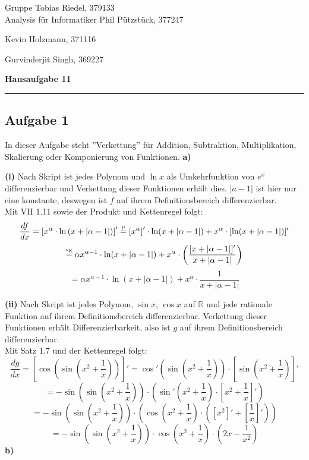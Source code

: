 \documentclass[a4paper,graphics,11pt]{article}
\newcommand{\aufgabe}[1]{\subsection*{Aufgabe #1}}
\newcommand{\up}[2]{\mathrel{\overset{\makebox[0pt]{\mbox{\normalfont\tiny #2}}}{#1}}}
\begin{document}
\noindent Gruppe              \hfill Tobias Riedel, 379133 \\
\noindent Analysis für Informatiker             \hfill Phil Pützstück, 377247 \\
\strut\hfill Kevin Holzmann, 371116\\
\strut\hfill Gurvinderjit Singh, 369227
\begin{center}
	\LARGE{\textbf{Hausaufgabe 11}}
\end{center}
\begin{center}
\rule[0.1ex]{\textwidth}{1pt}
\end{center}



\aufgabe{1}
In dieser Aufgabe steht ''Verkettung'' für Addition, Subtraktion, Multiplikation, Skalierung oder Komponierung
von Funktionen.
\textbf{a)}

\textbf{(i)}
Nach Skript ist jedes Polynom und $\ln x$ als Umkehrfunktion von $e^x$ differenzierbar und Verkettung dieser Funktionen erhält dies.
$|a-1|$ ist hier nur eine konstante, deswegen ist $f$ auf ihrem Definitionsbereich differenzierbar.\\
Mit VII 1.11 sowie der Produkt und Kettenregel folgt:
$$
    \frac{df}{dx} = \left[x^{\alpha} \cdot \ln\left(x+|\alpha-1|\right)\right]'
    \up{=}{P} \left[x^{\alpha}\right]'\cdot \ln(x+|\alpha-1|) + x^{\alpha} \cdot [\ln(x+|\alpha-1|)]'
$$$$
    \up{=}{*K} \alpha x^{\alpha-1}\cdot \ln(x+|\alpha-1|)
        + x^{\alpha} \cdot \left(\frac{[x+|\alpha-1|]'}{x+|\alpha-1|}\right)
$$$$
    = \alpha x^{\alpha-1}\cdot \ln(x+|\alpha-1|)
        + x^{\alpha} \cdot \frac{1}{x+|\alpha-1|}
$$



\textbf{(ii)}
Nach Skript ist jedes Polynom, $\sin x$, $\cos x$ auf $\mathbb{R}$ und jede rationale Funktion auf ihrem
Definitionsbereich differenzierbar. Verkettung dieser Funktionen erhält Differenzierbarkeit, also ist $g$
auf ihrem Definitionsbereich differenzierbar.\\
Mit Satz 1.7 und der Kettenregel folgt:
$$
    \frac{dg}{dx} = \left[\cos\left(\sin\left(x^2+\frac{1}{x}\right)\right)\right]'
    = \cos'\left(\sin\left(x^2+\frac{1}{x}\right)\right)\cdot \left[\sin\left(x^2+\frac{1}{x}\right)\right]'
$$$$
    = -\sin\left(\sin\left(x^2+\frac{1}{x}\right)\right) \cdot \left(\sin'\left(x^2+\frac{1}{x}\right)\cdot\left[x^2+\frac{1}{x}\right]'\right)
$$$$
    = -\sin\left(\sin\left(x^2+\frac{1}{x}\right)\right) \cdot \left(\cos\left(x^2+\frac{1}{x}\right)\cdot\left(\left[x^2\right]'+\left[\frac{1}{x}\right]'\right)\right)
$$$$
    = -\sin\left(\sin\left(x^2+\frac{1}{x}\right)\right) \cdot \cos\left(x^2+\frac{1}{x}\right)\cdot\left(2x-\frac{1}{x^2}\right)
$$
\newpage
\textbf{b)}
\end{document}
